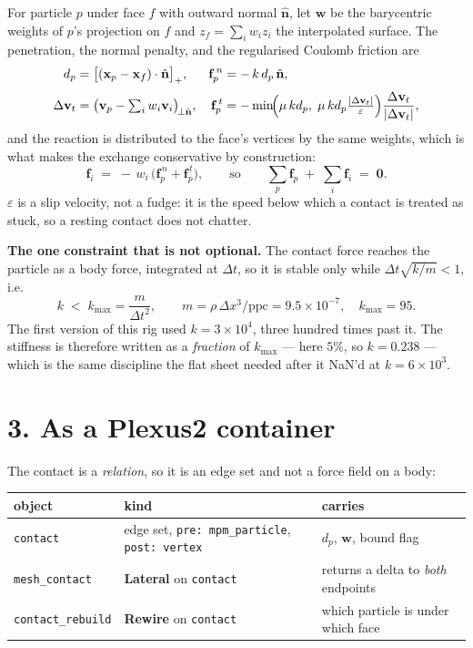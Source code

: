 \documentclass[10pt,a4paper]{article}
\newcommand{\code}[1]{\texttt{#1}}
\begin{document}
For particle $p$ under face $f$ with outward normal $\hat{\mathbf n}$, let $\mathbf w$ be the
barycentric weights of $p$'s projection on $f$ and $z_f=\sum_i w_i z_i$ the interpolated surface. The
penetration, the normal penalty, and the regularised Coulomb friction are
%
\begin{align}
d_p &= \bigl[(\mathbf x_p-\mathbf x_f)\cdot\hat{\mathbf n}\bigr]_+,
&\mathbf f^{\,n}_p &= -\,k\,d_p\,\hat{\mathbf n},
\label{eq:pen}\\[2pt]
\Delta\mathbf v_t &= \bigl(\mathbf v_p-\textstyle\sum_i w_i\mathbf v_i\bigr)_{\!\perp\hat{\mathbf n}},
&\mathbf f^{\,t}_p &= -\min\!\Bigl(\mu\,k d_p,\;\mu\,k d_p\tfrac{|\Delta\mathbf v_t|}{\varepsilon}\Bigr)
\frac{\Delta\mathbf v_t}{|\Delta\mathbf v_t|},
\label{eq:fric}
\end{align}
%
and the reaction is distributed to the face's vertices by the same weights, which is what makes the
exchange conservative by construction:
%
\begin{equation}
\mathbf f_i \;=\; -\,w_i\,\bigl(\mathbf f^{\,n}_p+\mathbf f^{\,t}_p\bigr),
\qquad\text{so}\qquad
\sum_p \mathbf f_p \;+\; \sum_i \mathbf f_i \;=\; \mathbf 0 .
\label{eq:reaction}
\end{equation}
%
$\varepsilon$ is a slip velocity, not a fudge: it is the speed below which a contact is treated as
stuck, so a resting contact does not chatter.

\textbf{The one constraint that is not optional.} The contact force reaches the particle as a body
force, integrated at $\Delta t$, so it is stable only while $\Delta t\sqrt{k/m}<1$, i.e.
%
\begin{equation}
k \;<\; k_{\max}=\frac{m}{\Delta t^{2}},\qquad
m=\rho\,\Delta x^{3}/\text{ppc}=9.5\times10^{-7},\quad k_{\max}=95 .
\label{eq:cfl}
\end{equation}
%
The first version of this rig used $k=3\times10^{4}$, three hundred times past it. The stiffness is
therefore written as a \emph{fraction} of $k_{\max}$ --- here $5\%$, so $k=0.238$ --- which is the same
discipline the flat sheet needed after it NaN'd at $k=6\times10^{3}$.

\section*{3.\; As a Plexus2 container}

The contact is a \emph{relation}, so it is an edge set and not a force field on a body:

\begin{center}\small
\begin{tabular}{@{}lll@{}}\toprule
object & kind & carries\\\midrule
\code{contact} & edge set, \code{pre: mpm\_particle}, \code{post: vertex} & $d_p$, $\mathbf w$, bound flag\\
\code{mesh\_contact} & \textbf{Lateral} on \code{contact} & returns a delta to \emph{both} endpoints\\
\code{contact\_rebuild} & \textbf{Rewire} on \code{contact} & which particle is under which face\\
\bottomrule
\end{tabular}
\end{center}
\end{document}
